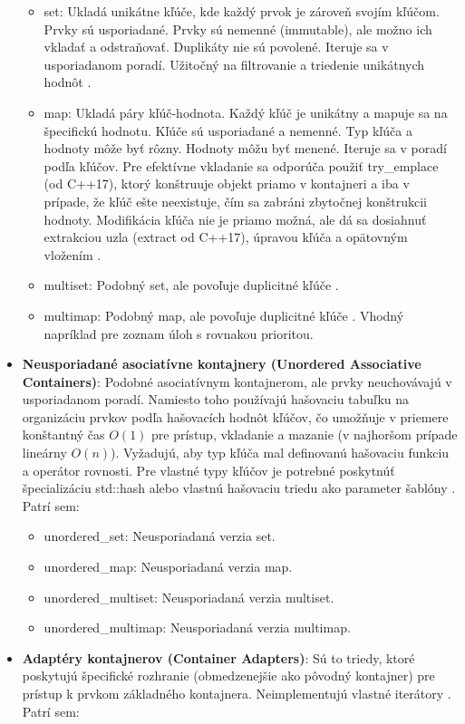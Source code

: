 \documentclass[11pt]{article}
\begin{document}
\begin{itemize}
\begin{itemize}
    \item set: Ukladá unikátne kľúče, kde každý prvok je zároveň svojím kľúčom. Prvky sú usporiadané. Prvky sú nemenné (immutable), ale možno ich vkladať a odstraňovať. Duplikáty nie sú povolené. Iteruje sa v usporiadanom poradí. Užitočný na filtrovanie a triedenie unikátnych hodnôt \cite{10162792}.
    \item map: Ukladá páry kľúč-hodnota. Každý kľúč je unikátny a mapuje sa na špecifickú hodnotu. Kľúče sú usporiadané a nemenné. Typ kľúča a hodnoty môže byť rôzny. Hodnoty môžu byť menené. Iteruje sa v poradí podľa kľúčov. Pre efektívne vkladanie sa odporúča použiť try\_emplace (od C++17), ktorý konštruuje objekt priamo v kontajneri a iba v prípade, že kľúč ešte neexistuje, čím sa zabráni zbytočnej konštrukcii hodnoty. Modifikácia kľúča nie je priamo možná, ale dá sa dosiahnuť extrakciou uzla (extract od C++17), úpravou kľúča a opätovným vložením \cite{10162792}.
    \item multiset: Podobný set, ale povoľuje duplicitné kľúče \cite{10162792}.
    \item multimap: Podobný map, ale povoľuje duplicitné kľúče \cite{10162792}. Vhodný napríklad pre zoznam úloh s rovnakou prioritou.
  \end{itemize}
  \item \textbf{Neusporiadané asociatívne kontajnery (Unordered Associative Containers)}: Podobné asociatívnym kontajnerom, ale prvky neuchovávajú v usporiadanom poradí. Namiesto toho používajú hašovaciu tabuľku na organizáciu prvkov podľa hašovacích hodnôt kľúčov, čo umožňuje v priemere konštantný čas $O(1)$ pre prístup, vkladanie a mazanie (v najhoršom prípade lineárny $O(n)$). Vyžadujú, aby typ kľúča mal definovanú hašovaciu funkciu a operátor rovnosti. Pre vlastné typy kľúčov je potrebné poskytnúť špecializáciu std::hash alebo vlastnú hašovaciu triedu ako parameter šablóny \cite{10162792}. Patrí sem:
  \begin{itemize}
    \item unordered\_set: Neusporiadaná verzia set.
    \item unordered\_map: Neusporiadaná verzia map.
    \item unordered\_multiset: Neusporiadaná verzia multiset.
    \item unordered\_multimap: Neusporiadaná verzia multimap.
  \end{itemize}
  \item \textbf{Adaptéry kontajnerov (Container Adapters)}: Sú to triedy, ktoré poskytujú špecifické rozhranie (obmedzenejšie ako pôvodný kontajner) pre prístup k prvkom základného kontajnera. Neimplementujú vlastné iterátory \cite{10162792}. Patrí sem:

\end{itemize}
\end{document}
